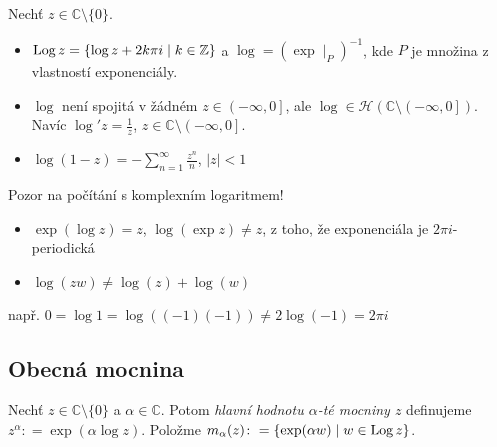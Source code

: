 \begin{properties}
Nechť $z \in\mathbb{C}\setminus\{0\}$.

\begin{itemize}
    \item $\operatorname*{Log} z =\{\log z +2k\pi i\mid k\in\mathbb{Z}\}$ a $
    \log =(\exp{}\mid _P)^{-1}$, kde $P$ je množina z vlastností exponenciály.
    \item $\log{}$ není spojitá v žádném $z\in\left (-\infty,0\right ]$, ale $\log{}\in \mathcal{H}(\mathbb{C}\setminus\left (-\infty,0\right ])$.
    \newline Navíc $\log'z=\frac{1}{z}$, $z\in\mathbb{C}\setminus\left (-\infty,0\right ]$.
     \item $\log(1-z)=-\sum_{n=1}^{\infty}\frac{z^n}{n}$, $\lvert z \rvert<1$
\end{itemize}

 Pozor na počítání s komplexním logaritmem! %

 \begin{itemize}
     \item $\exp(\log z)=z$, $\log(\exp{z})\neq z$, z toho, že exponenciála je $2\pi i$-periodická
     \item $\log(z w)\neq \log(z) + \log(w)$
 \end{itemize}
\end{properties}


např. $0=\log 1= \log((-1)(-1))\neq 2 \log(-1)=2\pi i$

\subsection{Obecná mocnina}

\begin{definition}
Nechť $z \in\mathbb{C}\setminus\{0\}$ a  $\alpha\in\mathbb{C}$. Potom \emph{hlavní hodnotu $\alpha$-té mocniny $z$} definujeme $z^{\alpha}\colon=\exp(\alpha \log z)$. Položme $m_{\alpha}(z)\colon=\{\exp(\alpha w)\mid w\in \operatorname*{Log} z\}$. %
\end{definition}


